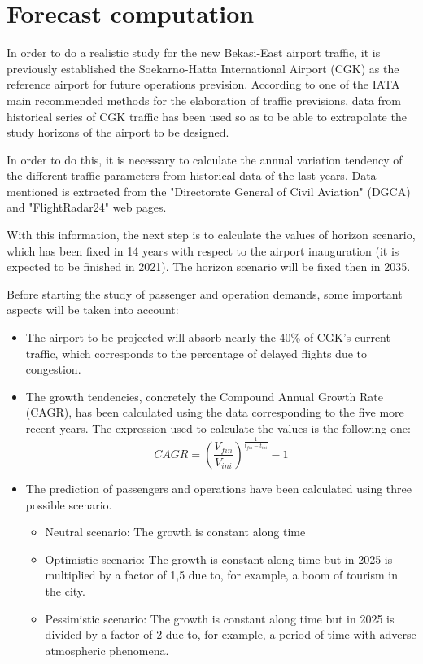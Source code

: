 \section{Forecast computation}
In order to do a realistic study for the new Bekasi-East airport traffic, it is previously established the Soekarno-Hatta International Airport (CGK) as the reference airport for future operations prevision. According to one of the IATA main recommended methods for the elaboration of traffic previsions, data from historical series of CGK traffic has been used so as to be able to extrapolate the study horizons of the airport to be designed.

In order to do this, it is necessary to calculate the annual variation tendency of the different traffic parameters from historical data of the last years. Data mentioned is extracted from the "Directorate General of Civil Aviation" (DGCA) and "FlightRadar24" web pages.

With this information, the next step is to calculate the values of horizon scenario, which has been fixed in 14 years with respect to the airport inauguration (it is expected to be finished in 2021). The horizon scenario will be fixed then in 2035.  

Before starting the study of passenger and operation demands, some important aspects will be taken into account:

\begin{itemize}
	\item The airport to be projected will absorb nearly the 40\% of CGK’s current traffic, which corresponds to the percentage of delayed flights due to congestion.
	\item The growth tendencies, concretely the Compound Annual Growth Rate (CAGR), has been calculated using the data corresponding to the five more recent years. The expression used to calculate the values is the following one:
	\begin{equation}
	CAGR=\left(\frac{V_{fin}}{V_{ini}}\right)^{\frac{1}{t_{fin}-t_{ini}}}-1
	\end{equation}
	\item The prediction of passengers and operations have been calculated using three possible scenario.
	\begin{itemize}
		\item Neutral scenario: The growth is constant along time
		\item Optimistic scenario: The growth is constant along time but in 2025 is multiplied by a factor of 1,5 due to, for example, a boom of tourism in the city.
		\item Pessimistic scenario: The growth is constant along time but in 2025 is divided by a factor of 2 due to, for example, a period of time with adverse atmospheric phenomena.
	\end{itemize}
\end{itemize}

